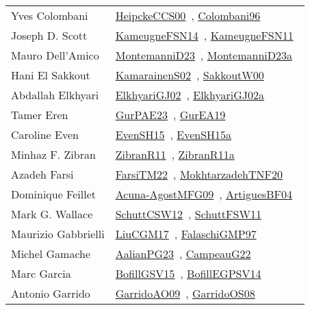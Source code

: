 {\begin{longtable}{p{4cm}p{20cm}}
Yves Colombani & \href{works/HeipckeCCS00.pdf}{HeipckeCCS00}~\cite{HeipckeCCS00}, \href{works/Colombani96.pdf}{Colombani96}~\cite{Colombani96}\\
Joseph D. Scott & \href{works/KameugneFSN14.pdf}{KameugneFSN14}~\cite{KameugneFSN14}, \href{works/KameugneFSN11.pdf}{KameugneFSN11}~\cite{KameugneFSN11}\\
Mauro Dell'Amico & \href{works/MontemanniD23.pdf}{MontemanniD23}~\cite{MontemanniD23}, \href{works/MontemanniD23a.pdf}{MontemanniD23a}~\cite{MontemanniD23a}\\
Hani El Sakkout & \href{works/KamarainenS02.pdf}{KamarainenS02}~\cite{KamarainenS02}, \href{works/SakkoutW00.pdf}{SakkoutW00}~\cite{SakkoutW00}\\
Abdallah Elkhyari & \href{works/ElkhyariGJ02.pdf}{ElkhyariGJ02}~\cite{ElkhyariGJ02}, \href{works/ElkhyariGJ02a.pdf}{ElkhyariGJ02a}~\cite{ElkhyariGJ02a}\\
Tamer Eren & \href{works/GurPAE23.pdf}{GurPAE23}~\cite{GurPAE23}, \href{works/GurEA19.pdf}{GurEA19}~\cite{GurEA19}\\
Caroline Even & \href{works/EvenSH15.pdf}{EvenSH15}~\cite{EvenSH15}, \href{works/EvenSH15a.pdf}{EvenSH15a}~\cite{EvenSH15a}\\
Minhaz F. Zibran & \href{works/ZibranR11.pdf}{ZibranR11}~\cite{ZibranR11}, \href{works/ZibranR11a.pdf}{ZibranR11a}~\cite{ZibranR11a}\\
Azadeh Farsi & \href{}{FarsiTM22}~\cite{FarsiTM22}, \href{works/MokhtarzadehTNF20.pdf}{MokhtarzadehTNF20}~\cite{MokhtarzadehTNF20}\\
Dominique Feillet & \href{works/Acuna-AgostMFG09.pdf}{Acuna-AgostMFG09}~\cite{Acuna-AgostMFG09}, \href{works/ArtiguesBF04.pdf}{ArtiguesBF04}~\cite{ArtiguesBF04}\\
Mark G. Wallace & \href{works/SchuttCSW12.pdf}{SchuttCSW12}~\cite{SchuttCSW12}, \href{works/SchuttFSW11.pdf}{SchuttFSW11}~\cite{SchuttFSW11}\\
Maurizio Gabbrielli & \href{works/LiuCGM17.pdf}{LiuCGM17}~\cite{LiuCGM17}, \href{works/FalaschiGMP97.pdf}{FalaschiGMP97}~\cite{FalaschiGMP97}\\
Michel Gamache & \href{works/AalianPG23.pdf}{AalianPG23}~\cite{AalianPG23}, \href{works/CampeauG22.pdf}{CampeauG22}~\cite{CampeauG22}\\
Marc Garcia & \href{works/BofillGSV15.pdf}{BofillGSV15}~\cite{BofillGSV15}, \href{works/BofillEGPSV14.pdf}{BofillEGPSV14}~\cite{BofillEGPSV14}\\
Antonio Garrido & \href{works/GarridoAO09.pdf}{GarridoAO09}~\cite{GarridoAO09}, \href{works/GarridoOS08.pdf}{GarridoOS08}~\cite{GarridoOS08}\\

\end{longtable}}
